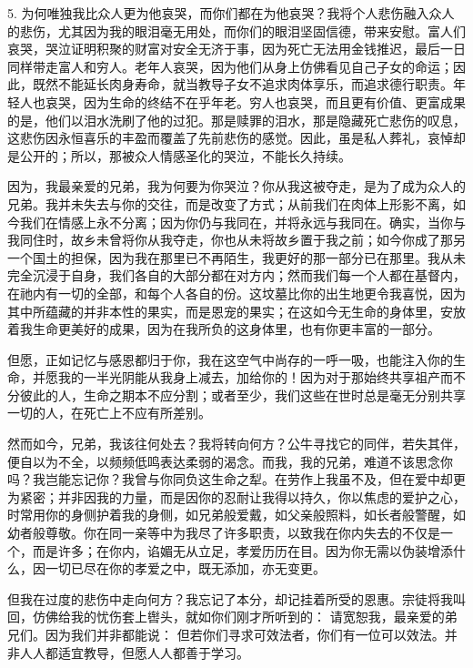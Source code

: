 5. 为何唯独我比众人更为他哀哭，而你们都在为他哀哭？我将个人悲伤融入众人的悲伤，尤其因为我的眼泪毫无用处，而你们的眼泪坚固信德，带来安慰。富人们哀哭，哭泣证明积聚的财富对安全无济于事，因为死亡无法用金钱推迟，最后一日同样带走富人和穷人。老年人哀哭，因为他们从身上仿佛看见自己子女的命运；因此，既然不能延长肉身寿命，就当教导子女不追求肉体享乐，而追求德行职责。年轻人也哀哭，因为生命的终结不在乎年老。穷人也哀哭，而且更有价值、更富成果的是，他们以泪水洗刷了他的过犯。那是赎罪的泪水，那是隐藏死亡悲伤的叹息，这悲伤因永恒喜乐的丰盈而覆盖了先前悲伤的感觉。因此，虽是私人葬礼，哀悼却是公开的；所以，那被众人情感圣化的哭泣，不能长久持续。\par

因为，我最亲爱的兄弟，我为何要为你哭泣？你从我这被夺走，是为了成为众人的兄弟。我并未失去与你的交往，而是改变了方式；从前我们在肉体上形影不离，如今我们在情感上永不分离；因为你仍与我同在，并将永远与我同在。确实，当你与我同住时，故乡未曾将你从我夺走，你也从未将故乡置于我之前；如今你成了那另一个国土的担保，因为我在那里已不再陌生，我更好的那一部分已在那里。我从未完全沉浸于自身，我们各自的大部分都在对方内；然而我们每一个人都在基督内，在祂内有一切的全部，和每个人各自的份。这坟墓比你的出生地更令我喜悦，因为其中所蕴藏的并非本性的果实，而是恩宠的果实；在这如今无生命的身体里，安放着我生命更美好的成果，因为在我所负的这身体里，也有你更丰富的一部分。\par

但愿，正如记忆与感恩都归于你，我在这空气中尚存的一呼一吸，也能注入你的生命，并愿我的一半光阴能从我身上减去，加给你的！因为对于那始终共享祖产而不分彼此的人，生命之期本不应分割；或者至少，我们这些在世时总是毫无分别共享一切的人，在死亡上不应有所差别。\par

然而如今，兄弟，我该往何处去？我将转向何方？公牛寻找它的同伴，若失其伴，便自以为不全，以频频低鸣表达柔弱的渴念。而我，我的兄弟，难道不该思念你吗？我岂能忘记你？我曾与你同负这生命之犁。在劳作上我虽不及，但在爱中却更为紧密；并非因我的力量，而是因你的忍耐让我得以持久，你以焦虑的爱护之心，时常用你的身侧护着我的身侧，如兄弟般爱戴，如父亲般照料，如长者般警醒，如幼者般尊敬。你在同一亲等中为我尽了许多职责，以致我在你内失去的不仅是一个，而是许多；在你内，谄媚无从立足，孝爱历历在目。因为你无需以伪装增添什么，因一切已尽在你的孝爱之中，既无添加，亦无变更。\par

但我在过度的悲伤中走向何方？我忘记了本分，却记挂着所受的恩惠。宗徒将我叫回，仿佛给我的忧伤套上辔头，就如你们刚才所听到的： 请宽恕我，最亲爱的弟兄们。因为我们并非都能说： 但若你们寻求可效法者，你们有一位可以效法。并非人人都适宜教导，但愿人人都善于学习。\par

